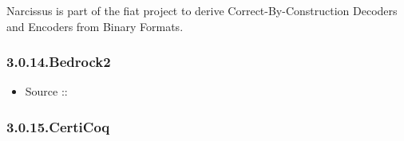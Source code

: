 \documentclass[12pt,twoside]{article}
\begin{document}
\noindent{}Narcissus is part of the fiat project to derive
Correct-By-Construction Decoders and Encoders from Binary Formats.%

\subsubsection{3.0.14.\hspace*{0.5em}Bedrock2}\label{sec-bedrock2}%

\begin{itemize}[noitemsep,topsep=\mdcompacttopsep]%

\item{}Source ::%
\end{itemize}%

\subsubsection{3.0.15.\hspace*{0.5em}CertiCoq}\label{sec-certicoq}%
\end{document}
